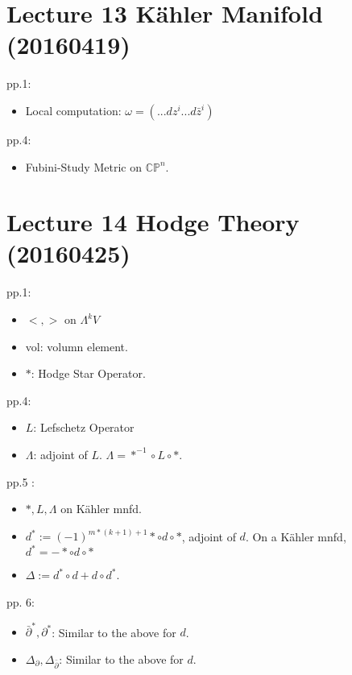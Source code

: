 \documentclass{book}
\numberwithin{equation}{subsection} %
\theoremstyle{definition}
\begin{document}
\section{Lecture 13 Kähler Manifold (20160419)}
pp.1:
\begin{itemize}
    \item Local computation: $\omega = (...dz^i...d\bar{z}^i)$
\end{itemize}
pp.4:
\begin{itemize}
    \item Fubini-Study Metric on $\mathbb{CP}^n$.
\end{itemize}

\section{Lecture 14 Hodge Theory (20160425)}
pp.1:
\begin{itemize}
    \item $<,>$ on $\Lambda^k V$
    \item vol: volumn element.
    \item $*$: Hodge Star Operator.
\end{itemize}
pp.4:
\begin{itemize}
    \item $L$: Lefschetz Operator
    \item $\Lambda$: adjoint of $L$. $\Lambda = *^{-1}\circ L\circ *$.
\end{itemize}
pp.5 :
\begin{itemize}
    \item $*,L,\Lambda$ on Kähler mnfd.
    \item $d^*:= (-1)^{m*(k+1)+1}*\circ d\circ*$, adjoint of $d$. On a Kähler mnfd, $d^*= -*\circ d\circ*$
    \item $\Delta:=d^*\circ d + d\circ d^*$.
\end{itemize}
pp. 6:
\begin{itemize}
    \item $\bar{\partial}^*, \partial^*$: Similar to the above for $d$.
    \item $\Delta_\partial, \Delta_{\bar{\partial}}$: Similar to the above for $d$.
\end{itemize}
	
\end{document}
